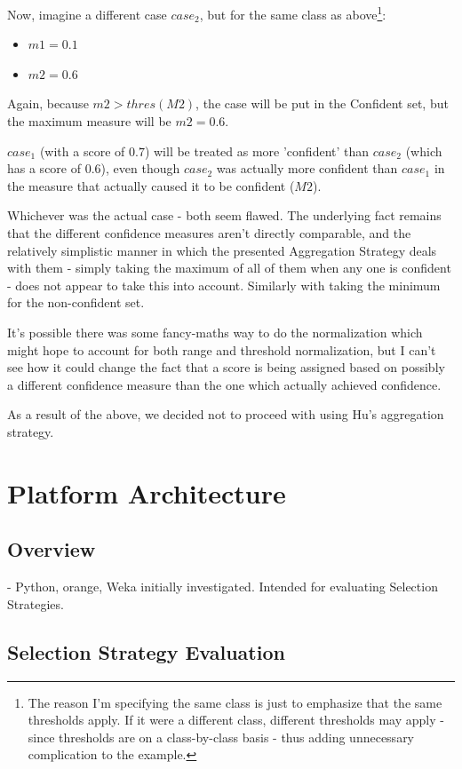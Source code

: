 \documentclass[a4paper,11pt]{report}
\begin{document}
\begin{enumerate}
	Now, imagine a different case $case_{2}$, but for the same class as above\footnote{The reason I'm specifying the same class is just to emphasize that the same thresholds apply. If it were a different class, different thresholds may apply - since thresholds are on a class-by-class basis - thus adding unnecessary complication to the example.}:
	\begin{itemize}
		\item $m1 = 0.1$
		\item $m2 = 0.6$
	\end{itemize}
	Again, because $m2 > thres(M2)$, the case will be put in the Confident set, but the maximum measure will be $m2 = 0.6$. 
	
	$case_{1}$ (with a score of $0.7$) will be treated as more 'confident' than $case_{2}$ (which has a score of $0.6$), even though $case_{2}$ was actually more confident than $case_{1}$ in the measure that actually caused it to be confident ($M2$).
	
\end{enumerate}

Whichever was the actual case - both seem flawed. The underlying fact remains that the different confidence measures aren't directly comparable, and the relatively simplistic manner in which the presented Aggregation Strategy deals with them - simply taking the maximum of all of them when any one is confident - does not appear to take this into account. Similarly with taking the minimum for the non-confident set.

It's possible there was some fancy-maths way to do the normalization which might hope to account for both range and threshold normalization, but I can't see how it could change the fact that a score is being assigned based on possibly a different confidence measure than the one which actually achieved confidence.

As a result of the above, we decided not to proceed with using Hu's aggregation strategy.

\chapter{Platform Architecture}
\section{Overview}
- Python, orange, Weka initially investigated. Intended for evaluating Selection Strategies.

\section{Selection Strategy Evaluation}
\end{document}
